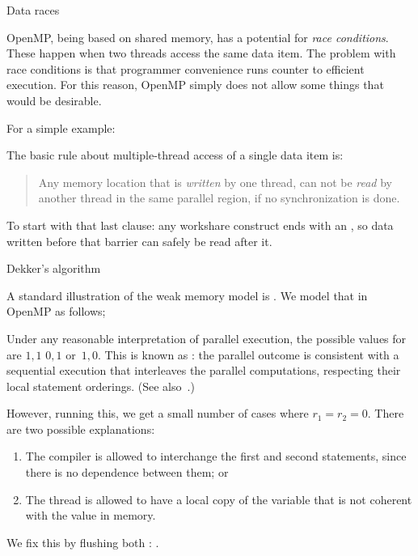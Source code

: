  {Data races}

OpenMP, being based on shared memory, has a potential for \emph{race
  conditions}. These happen when two threads access the same data
item. The problem with race conditions is that programmer convenience
runs counter to efficient execution. For this reason, OpenMP simply
does not allow some things that would be desirable.

For a simple example:

The basic rule about multiple-thread access of a single data item is:
\begin{quote}
  Any memory location that is \emph{written} by one thread, can not be
  \emph{read} by another thread in the same parallel region, if no
  synchronization is done.
\end{quote}

To start with that last clause: any workshare construct ends with an
, so data written before that barrier
can safely be read after it.

 {Dekker's algorithm}

A standard illustration of the weak memory model is
.
We model that in OpenMP as follows;

Under any reasonable interpretation of parallel execution,
the possible values for  are $1,1$ $0,1$ or~$1,0$.
This is known as :
the parallel outcome is consistent with a sequential execution that
interleaves the parallel computations, respecting their local statement orderings.
(See also~.)

However, running this, we get a small number of cases where $r_1=r_2=0$.
There are two possible explanations:
\begin{enumerate}
\item The compiler is allowed to interchange the first and second statements,
  since there is no dependence between them; or
\item The thread is allowed to have a local copy of the variable
  that is not coherent with the value in memory.
\end{enumerate}

We fix this by flushing both :
.

